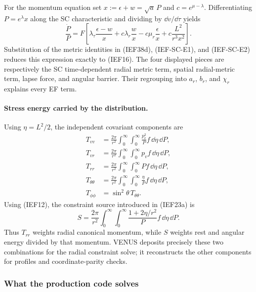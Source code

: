 For the momentum equation set
\(x:=\epsilon+w=\sqrt a\,P\) and \(c=e^{\mu-\lambda}\).
Differentiating \(P=e^\lambda x\) along the SC characteristic and dividing by
\(\dd v/\dd\tau\) yields
\[
 \frac{\dot P}{P}
 =F\left[
   \lambda_\tau\frac{\epsilon-w}{x}
  +c\lambda_r\frac{w}{x}
  -c\mu_r\frac{\epsilon}{x}
  +c\frac{L^2}{r^3x^2}\right].                           \tag{IEF-SC-V1}
\]
Substitution of the metric identities in
(IEF38d), (IEF-SC-E1), and (IEF-SC-E2) reduces this expression exactly to
(IEF16).  The four displayed pieces are respectively the SC time-dependent
radial metric term, spatial radial-metric term, lapse force, and angular
barrier.  Their regrouping into \(a_r\), \(b_r\), and \(\chi_r\) explains
every EF term.

\paragraph{Stress energy carried by the distribution.}
Using \(\eta=L^2/2\), the independent covariant components are
\begin{align}
 T_{vv}
 &=\frac{2\pi}{r^2}\int_0^\infty\!\int_0^\infty
   \frac{p_v^2}{P}f\,\dd\eta\,\dd P,                  \tag{IEF18}\\
 T_{vr}
 &=\frac{2\pi}{r^2}\int_0^\infty\!\int_0^\infty
   p_v f\,\dd\eta\,\dd P,                            \tag{IEF19}\\
 T_{rr}
 &=\frac{2\pi}{r^2}\int_0^\infty\!\int_0^\infty
   P f\,\dd\eta\,\dd P,                              \tag{IEF20}\\
 T_{\theta\theta}
 &=\frac{2\pi}{r^2}\int_0^\infty\!\int_0^\infty
   \frac{\eta}P f\,\dd\eta\,\dd P,                \tag{IEF21}\\
 T_{\phi\phi}&=\sin^2\theta\,T_{\theta\theta}.           \tag{IEF22}
\end{align}
Using (IEF12), the constraint source introduced in (IEF23a) is
\[
 S=\frac{2\pi}{r^2}\int_0^\infty\!\int_0^\infty
   \frac{1+2\eta/r^2}{P}f\,\dd\eta\,\dd P.         \tag{IEF23}
\]
Thus \(T_{rr}\) weights radial canonical momentum, while \(S\) weights rest
and angular energy divided by that momentum.  VENUS deposits precisely these
two combinations for the radial constraint solve; it reconstructs the other
components for profiles and coordinate-parity checks.

\subsubsection{What the production code solves}
\label{sec:ef-what-code-solves}

